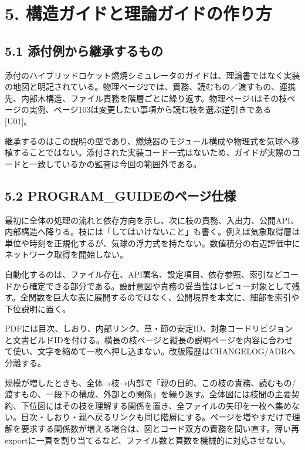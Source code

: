 \documentclass[11pt,a4paper]{article}
\begin{document}
\section{5.
構造ガイドと理論ガイドの作り方}\label{ux69cbux9020ux30acux30a4ux30c9ux3068ux7406ux8ad6ux30acux30a4ux30c9ux306eux4f5cux308aux65b9}

\subsection{5.1
添付例から継承するもの}\label{ux6dfbux4ed8ux4f8bux304bux3089ux7d99ux627fux3059ux308bux3082ux306e}

添付のハイブリッドロケット燃焼シミュレータのガイドは、理論書ではなく実装の地図と明記されている。物理ページ2では、責務、読むもの／渡すもの、連携先、内部木構造、ファイル責務を階層ごとに繰り返す。物理ページ4はその枝ページの実例、ページ103は変更したい事項から読む枝を選ぶ逆引きである
{[}U01{]}。

継承するのはこの説明の型であり、燃焼器のモジュール構成や物理式を気球へ移植することではない。添付された実装コード一式はないため、ガイドが実際のコードと一致しているかの監査は今回の範囲外である。

\subsection{5.2
PROGRAM\_GUIDEのページ仕様}\label{program_guideux306eux30daux30fcux30b8ux4ed5ux69d8}

最初に全体の処理の流れと依存方向を示し、次に枝の責務、入出力、公開API、内部構造へ降りる。枝には「してはいけないこと」も書く。例えば気象取得層は単位や時刻を正規化するが、気球の浮力式を持たない。数値積分の右辺評価中にネットワーク取得を開始しない。

自動化するのは、ファイル存在、API署名、設定項目、依存参照、索引などコードから確定できる部分である。設計意図や責務の妥当性はレビュー対象として残す。全関数を巨大な表に展開するのではなく、公開境界を本文に、細部を索引や下位説明に置く。

PDFには目次、しおり、内部リンク、章・節の安定ID、対象コードリビジョンと文書ビルドIDを付ける。横長の枝ページと縦長の説明ページを内容に合わせて使い、文字を縮めて一枚へ押し込まない。改版履歴はCHANGELOG/ADRへ分離する。

規模が増したときも、全体→枝→内部で「親の目的、この枝の責務、読むもの/渡すもの、一段下の構成、外部との関係」を繰り返す。全体図には枝間の主要契約、下位図にはその枝を理解する関係を置き、全ファイルの矢印を一枚へ集めない。目次・しおり・親へ戻るリンクも同じ階層にする。ページを増やすだけで理解を要求する関係数が増える場合は、図とコード双方の責務を問い直す。薄い再exportに一頁を割り当てるなど、ファイル数と頁数を機械的に対応させない。
\end{document}
